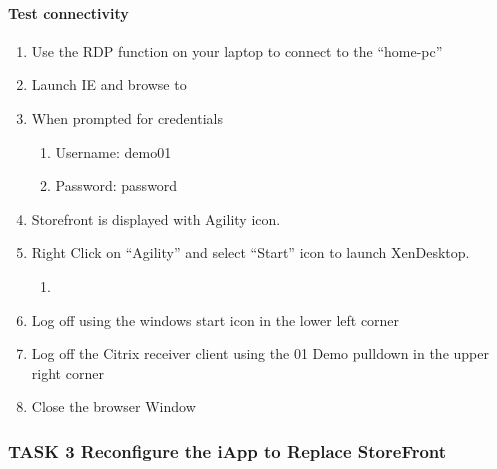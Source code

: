 \documentclass[letterpaper,10pt,english]{sphinxmanual}
\begin{document}
\paragraph{Test connectivity}
\label{\detokenize{class2/module2/lab1:test-connectivity}}\begin{enumerate}
\item {} 
Use the RDP function on your laptop to connect to the “home-pc”

\item {} 
Launch IE and browse to 

\item {} 
When prompted for credentials
\begin{enumerate}
\item {} 
Username: demo01

\item {} 
Password: password

\end{enumerate}

\item {} 
Storefront is displayed with Agility icon.

\item {} 
Right Click on “Agility” and select “Start” icon to launch
XenDesktop.
\begin{enumerate}
\item {} 

\end{enumerate}

\item {} 
Log off using the windows start icon in the lower left corner

\item {} 
Log off the Citrix receiver client using the 01 Demo pulldown in the
upper right corner

\item {} 
Close the browser Window

\end{enumerate}


\subsubsection{TASK 3 \textendash{} Reconfigure the iApp to Replace StoreFront}
\label{\detokenize{class2/module2/lab1:task-3-reconfigure-the-iapp-to-replace-storefront}}
\end{document}
